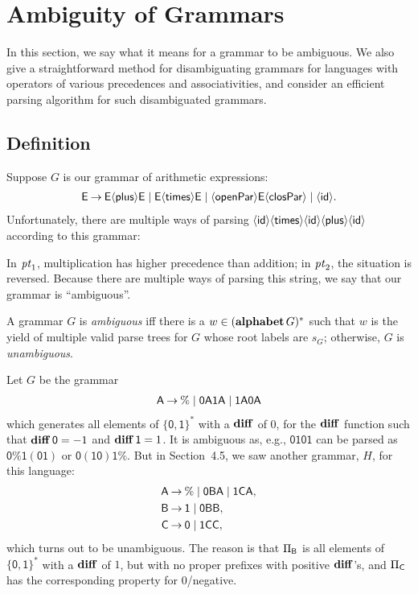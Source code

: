 \section{Ambiguity of Grammars}
\label{AmbiguityOfGrammars}

%

In this section, we say what it means for a grammar to be ambiguous.
We also give a straightforward method for disambiguating
grammars for languages with operators of various precedences and
associativities, and consider an efficient parsing algorithm for
such disambiguated grammars.

\subsection{Definition}

Suppose $G$ is our grammar of arithmetic expressions:
\begin{gather*}
\mathsf{E\mathbin{\to} E{\langle\mathsf{plus}\rangle} E\mid E{\langle\mathsf{times}\rangle} E\mid {\langle\mathsf{openPar}\rangle} E{\langle\mathsf{closPar}\rangle} \mid
{\langle\mathsf{id}\rangle}} .
\end{gather*}
Unfortunately,
there are multiple ways of parsing
${\langle\mathsf{id}\rangle}{\langle\mathsf{times}\rangle}{\langle\mathsf{id}\rangle}{\langle\mathsf{plus}\rangle}{\langle\mathsf{id}\rangle}$ according to this grammar:
\begin{center}

\end{center}
In ${\it pt}_1$, multiplication has higher precedence than addition; in
${\it pt}_2$, the situation is reversed.  Because there are multiple ways
of parsing this string, we say that our grammar is ``ambiguous''.

%
A grammar $G$ is \emph{ambiguous} iff there is a
$w\in(\mathbf{alphabet}\,G)^*$ such that $w$ is the yield of multiple valid
parse trees for $G$ whose root labels are $s_G$; otherwise, $G$ is
%
\emph{unambiguous}.

Let $G$ be the grammar
\begin{gather*}
\mathsf{A} \mathbin{\to} \% \mid \mathsf{0A1A} \mid \mathsf{1A0A}
\end{gather*}
which generates all elements
of $\{\mathsf{0,1}\}^*$ with a $\mathbf{diff}$ of $0$, for the $\mathbf{diff}$
function such that $\mathbf{diff}\,\mathsf{0} = -1$ and $\mathbf{diff}\,\mathsf{1} = 1$.
It is ambiguous as, e.g., $\mathsf{0101}$ can be parsed as
$\mathsf{0\%1(01)}$ or $\mathsf{0(10)1\%}$.
But in Section~4.5, we saw another grammar, $H$, for this
language:
\begin{align*}
\mathsf{A} &\mathbin{\to} \% \mid \mathsf{0}\mathsf{B}\mathsf{A} \mid \mathsf{1}\mathsf{C}\mathsf{A} , \\
\mathsf{B} &\mathbin{\to} \mathsf{1} \mid \mathsf{0}\mathsf{B}\mathsf{B} , \\
\mathsf{C} &\mathbin{\to} \mathsf{0} \mid \mathsf{1}\mathsf{C}\mathsf{C} ,
\end{align*}
which turns out to be unambiguous.
The reason is that $\Pi_{\mathsf{B}}$ is all elements of $\{\mathsf{0,1}\}^*$
with a $\mathbf{diff}$ of $1$, but with no proper prefixes with positive
$\mathbf{diff}$'s, and $\Pi_{\mathsf{C}}$ has the corresponding property for
$0$/negative.

